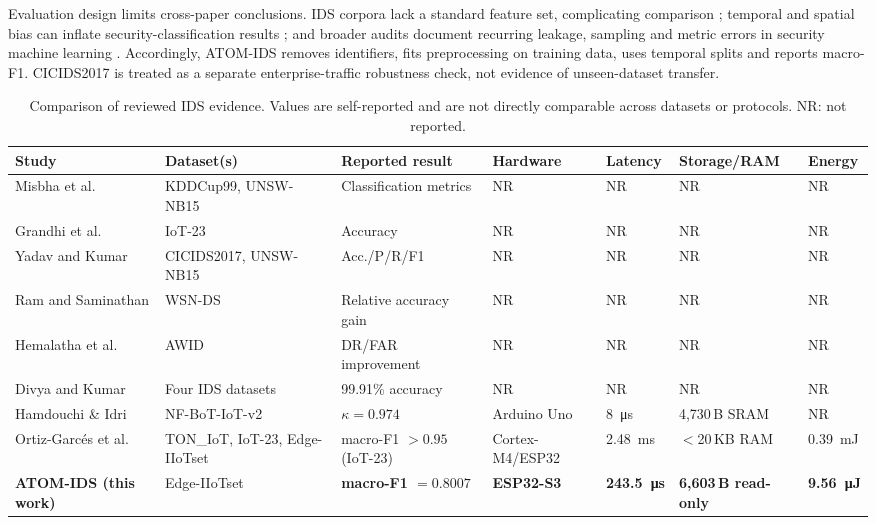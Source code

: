 \documentclass[10pt,letterpaper,twocolumn]{article}
\begin{document}
Evaluation design limits cross-paper conclusions. IDS corpora lack a standard
feature set, complicating comparison \cite{sarhan2022standard}; temporal and
spatial bias can inflate security-classification results
\cite{pendlebury2019tesseract}; and broader audits document recurring leakage,
sampling and metric errors in security machine learning \cite{arp2022dos}.
Accordingly, ATOM-IDS removes identifiers, fits preprocessing on training data,
uses temporal splits and reports macro-F1. CICIDS2017 is treated as a separate
enterprise-traffic robustness check, not evidence of unseen-dataset transfer.

\begin{table}[!t]
\centering
\caption{Comparison of reviewed IDS evidence. Values are self-reported and are
not directly comparable across datasets or protocols. NR: not reported.}
\label{tab:related-compare}
\scriptsize\setlength{\tabcolsep}{2.2pt}
\renewcommand{\arraystretch}{1.10}
\begin{tabular}{@{}p{2.15cm}p{2.45cm}p{2.15cm}p{1.65cm}p{1.55cm}p{1.85cm}p{1.55cm}@{}}
\toprule
Study & Dataset(s) & Reported result & Hardware & Latency & Storage/RAM & Energy \\
\midrule
Misbha et al.\ \cite{misbha2024security} & KDDCup99, UNSW-NB15 & Classification metrics & NR & NR & NR & NR \\
Grandhi et al.\ \cite{grandhi2025secure} & IoT-23 & Accuracy & NR & NR & NR & NR \\
Yadav and Kumar \cite{yadav2026anfis} & CICIDS2017, UNSW-NB15 & Acc./P/R/F1 & NR & NR & NR & NR \\
Ram and Saminathan \cite{ram2025sapgan} & WSN-DS & Relative accuracy gain & NR & NR & NR & NR \\
Hemalatha et al.\ \cite{hemalatha2025igann} & AWID & DR/FAR improvement & NR & NR & NR & NR \\
Divya and Kumar \cite{divya2026crossstage} & Four IDS datasets & 99.91\% accuracy & NR & NR & NR & NR \\
Hamdouchi \& Idri \cite{hamdouchi2025tinyml} & NF-BoT-IoT-v2 & $\kappa=0.974$ & Arduino Uno & \SI{8}{\micro\second} & 4,730\,B SRAM & NR \\
Ortiz-Garc\'{e}s et al.\ \cite{ortizgarces2026nas} & TON\_IoT, IoT-23, Edge-IIoTset & macro-F1 $>0.95$ (IoT-23) & Cortex-M4/ESP32 & \SI{2.48}{\milli\second} & $<$20\,KB RAM & \SI{0.39}{\milli\joule} \\
\textbf{ATOM-IDS (this work)} & Edge-IIoTset & \textbf{macro-F1 $=0.8007$} & \textbf{ESP32-S3} & \textbf{\SI{243.5}{\micro\second}} & \textbf{6,603\,B read-only} & \textbf{\SI{9.56}{\micro\joule}} \\
\bottomrule
\end{tabular}
\end{table}
\end{document}
